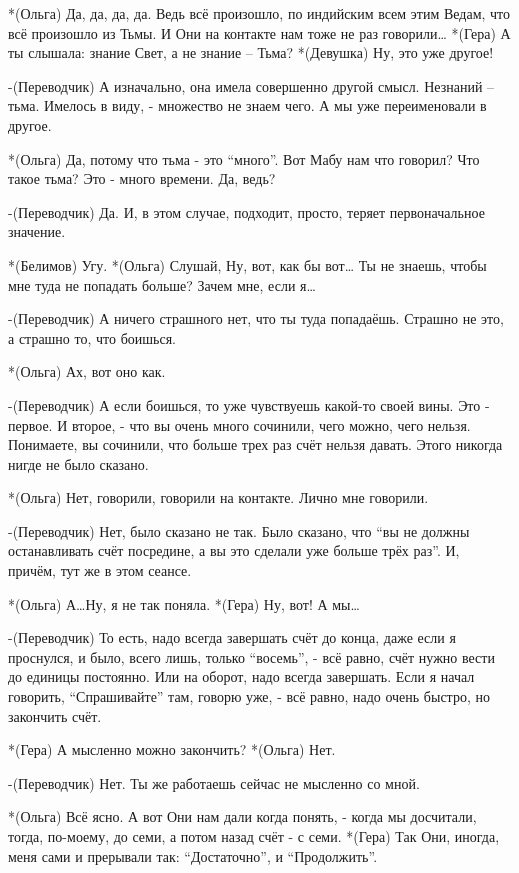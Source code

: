 *(Ольга) Да, да, да, да. Ведь всё произошло, по индийским всем этим Ведам, что всё произошло из Тьмы. И Они на контакте нам тоже не раз говорили…
*(Гера) А ты слышала: знание Свет, а не знание – Тьма?
*(Девушка) Ну, это уже другое!

-(Переводчик) А изначально, она имела совершенно другой смысл. Незнаний – тьма. Имелось в виду, - множество не знаем чего. А мы уже переименовали в другое. 

*(Ольга) Да, потому что тьма - это “много”. Вот Мабу нам что говорил? Что такое тьма? Это - много времени. Да, ведь? 

-(Переводчик) Да. И, в этом случае, подходит, просто, теряет первоначальное значение.

*(Белимов) Угу.
*(Ольга) Слушай, Ну, вот, как бы вот… Ты не знаешь, чтобы мне туда не попадать больше? Зачем мне, если я…

-(Переводчик) А ничего страшного нет, что ты туда попадаёшь. Страшно не это, а страшно то, что боишься. 

*(Ольга) Ах, вот оно как.

-(Переводчик) А если боишься, то уже чувствуешь какой-то своей вины. Это - первое. И второе, - что вы очень много сочинили, чего можно, чего нельзя. Понимаете, вы сочинили, что больше трех раз счёт нельзя давать. Этого никогда нигде не было сказано. 

*(Ольга) Нет, говорили, говорили на контакте. Лично мне говорили.

-(Переводчик) Нет, было сказано не так. Было сказано, что “вы не должны останавливать счёт посредине, а вы это сделали уже больше трёх раз”. И, причём, тут же в этом сеансе.  

*(Ольга) А…Ну, я не так поняла.
*(Гера) Ну, вот! А мы…

-(Переводчик) То есть, надо всегда завершать счёт до конца, даже если я проснулся, и было, всего лишь, только “восемь”, - всё равно, счёт нужно вести до единицы постоянно. Или на оборот, надо всегда завершать. Если я начал говорить, “Спрашивайте” там, говорю уже, - всё равно, надо очень быстро, но закончить счёт. 

*(Гера) А мысленно можно закончить?
*(Ольга) Нет.

-(Переводчик) Нет. Ты же работаешь сейчас не мысленно со мной.

*(Ольга) Всё ясно. А вот Они нам дали когда понять, - когда мы досчитали, тогда, по-моему, до семи, а потом назад счёт - с семи.
*(Гера) Так Они, иногда, меня сами и прерывали так: “Достаточно”, и “Продолжить”.

